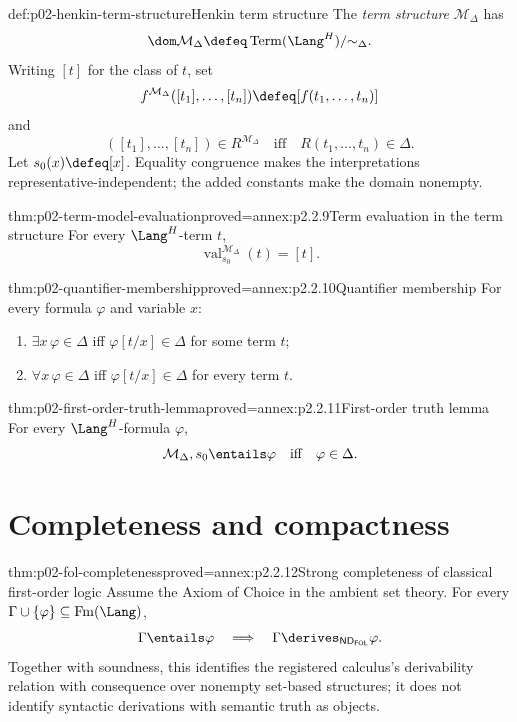 \begin{hbdefinition}{def:p02-henkin-term-structure}{Henkin term structure}
The \emph{term structure} \(\mathcal M_\Delta\) has
\[
 \dom\mathcal M_\Delta
   \defeq\operatorname{Term}(\Lang^H)/{\sim_\Delta}.
\]
Writing \([t]\) for the class of \(t\), set
\[
 f^{\mathcal M_\Delta}([t_1],\ldots,[t_n])
   \defeq[f(t_1,\ldots,t_n)]
\]
and
\[
 ([t_1],\ldots,[t_n])\in R^{\mathcal M_\Delta}
 \quad\text{iff}\quad R(t_1,\ldots,t_n)\in\Delta.
\]
Let \(s_0(x)\defeq[x]\).  Equality congruence makes the interpretations
representative-independent; the added constants make the domain nonempty.
\end{hbdefinition}

\begin{hblemma}{thm:p02-term-model-evaluation}{proved=annex:p2.2.9}{Term evaluation in the term structure}
For every \(\Lang^H\)-term \(t\),
\[
 \operatorname{val}^{\mathcal M_\Delta}_{s_0}(t)=[t].
\]
\end{hblemma}

\begin{hblemma}{thm:p02-quantifier-membership}{proved=annex:p2.2.10}{Quantifier membership}
For every formula \(\varphi\) and variable \(x\):
\begin{enumerate}
  \item \(\exists x\,\varphi\in\Delta\) iff
        \(\varphi[t/x]\in\Delta\) for some term \(t\);
  \item \(\forall x\,\varphi\in\Delta\) iff
        \(\varphi[t/x]\in\Delta\) for every term \(t\).
\end{enumerate}
\end{hblemma}

\begin{hblemma}{thm:p02-first-order-truth-lemma}{proved=annex:p2.2.11}{First-order truth lemma}
For every \(\Lang^H\)-formula \(\varphi\),
\[
 \mathcal M_\Delta,s_0\entails\varphi
 \quad\text{iff}\quad
 \varphi\in\Delta.
\]
\end{hblemma}

\section{Completeness and compactness}
\label{sec:p02-first-order-completeness-results}

\begin{hbtheorem}{thm:p02-fol-completeness}{proved=annex:p2.2.12}{Strong completeness of classical first-order logic}
Assume the Axiom of Choice in the ambient set theory.  For every
\(\Gamma\cup\{\varphi\}\subseteq\operatorname{Fm}(\Lang)\),
\[
 \Gamma\entails\varphi
 \quad\Longrightarrow\quad
 \Gamma\derives_{\mathsf{ND}_{\mathsf{FOL}}}\varphi.
\]
Together with soundness, this identifies the registered calculus's
derivability relation with consequence over nonempty set-based structures;
it does not identify syntactic derivations with semantic truth as objects.
\end{hbtheorem}

